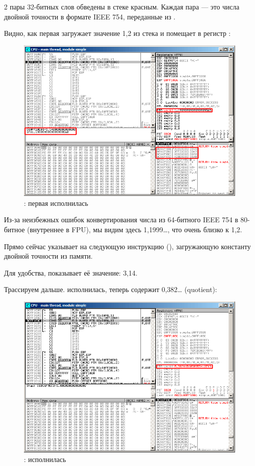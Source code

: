 ﻿\clearpage
{}
\myindex{\olly}

2 пары 32-битных слов обведены в стеке красным.
Каждая пара --- это числа двойной точности в формате IEEE 754, переданные из \main.

Видно, как первая \FLD загружает значение 1,2 из стека и помещает в регистр :

\begin{figure}[H]
\centering
\includegraphics[scale=\FigScale]{patterns/12_FPU/1_simple/olly1.png}
\caption{\olly: первая \FLD исполнилась}
\label{fig:FPU_simple_olly_1}
\end{figure}

Из-за неизбежных ошибок конвертирования числа из 64-битного IEEE 754 в 80-битное (внутреннее в FPU),
мы видим здесь 1,1999\ldots, что очень близко к 1,2.

Прямо сейчас \EIP указывает на следующую инструкцию (\FDIV), загружающую константу двойной точности 
из памяти.

Для удобства, \olly показывает её значение: 3,14.

\clearpage
Трассируем дальше. 
\FDIV исполнилась, теперь  содержит 0,382\ldots
(\gls{quotient}):

\begin{figure}[H]
\centering
\includegraphics[scale=\FigScale]{patterns/12_FPU/1_simple/olly2.png}
\caption{\olly: \FDIV исполнилась}
\label{fig:FPU_simple_olly_2}
\end{figure}

